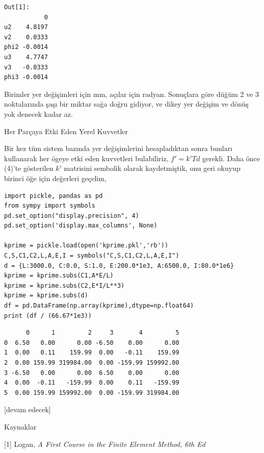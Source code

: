 \documentclass[12pt,fleqn]{article}\usepackage{../../common}
\begin{document}
\begin{verbatim}
Out[1]: 
           0
u2    4.8197
v2    0.0333
phi2 -0.0014
u3    4.7747
v3   -0.0333
phi3 -0.0014
\end{verbatim}

Birimler yer değişimleri için mm, açılar için radyan. Sonuçlara göre düğüm 2 ve
3 noktalarında şaşı bir miktar sağa doğru gidiyor, ve dikey yer değişim ve dönüş
yok denecek kadar az.

Her Parçaya Etki Eden Yerel Kuvvetler

Bir kez tüm sistem bazında yer değişimlerini hesapladıktan sonra bunları
kullanarak her ögeye etki eden kuvvetleri bulabiliriz, $f' = k' T d$
gerekli. Daha önce (4)'te gösterilen $k'$ matrisini sembolik olarak
kaydetmiştik, onu geri okuyup birinci öğe için değerleri geçelim,

\begin{verbatim}
import pickle, pandas as pd
from sympy import symbols
pd.set_option("display.precision", 4)
pd.set_option('display.max_columns', None)

kprime = pickle.load(open('kprime.pkl','rb'))
C,S,C1,C2,L,A,E,I = symbols("C,S,C1,C2,L,A,E,I")
d = {L:3000.0, C:0.0, S:1.0, E:200.0*1e3, A:6500.0, I:80.0*1e6}
kprime = kprime.subs(C1,A*E/L) 
kprime = kprime.subs(C2,E*I/L**3)
kprime = kprime.subs(d) 
df = pd.DataFrame(np.array(kprime),dtype=np.float64)
print (df / (66.67*1e3))
\end{verbatim}

\begin{verbatim}
      0      1         2     3       4         5
0  6.50   0.00      0.00 -6.50    0.00      0.00
1  0.00   0.11    159.99  0.00   -0.11    159.99
2  0.00 159.99 319984.00  0.00 -159.99 159992.00
3 -6.50   0.00      0.00  6.50    0.00      0.00
4  0.00  -0.11   -159.99  0.00    0.11   -159.99
5  0.00 159.99 159992.00  0.00 -159.99 319984.00
\end{verbatim}


















[devam edecek]

Kaynaklar

[1] Logan, {\em A First Course in the Finite Element Method, 6th Ed}
\end{document}

